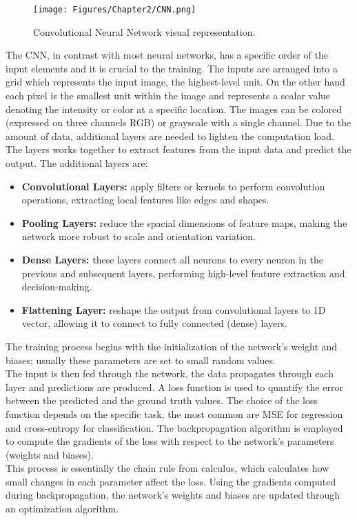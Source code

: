 \begin{figure}[th]
    \centering
    \texttt{[image: Figures/Chapter2/CNN.png]}
    \caption[Convolution Neural Network]{Convolutional Neural Network visual representation.}

    \label{fig:CNN}
\end{figure}
The CNN, in contrast with most neural networks, has a specific order of the input elements and it is crucial to the training. The inputs are arranged into a grid which represents the input image, the highest-level unit. On the other hand each pixel is the smallest unit within the image and represents a scalar value denoting the intensity or color at a specific location. The images can be colored (expressed on three channels RGB) or grayscale with a single channel.
Due to the amount of data, additional layers are needed to lighten the computation load. The layers works together to extract features from the input data and predict the output. The additional layers are:
\begin{itemize}
    \item\textbf{Convolutional Layers:} apply filters or kernels to perform convolution operations, extracting local features like edges and shapes.
    \item\textbf{Pooling Layers:} reduce the spacial dimensions of feature maps, making the network more robust to scale and orientation variation.
    \item\textbf{Dense Layers:} these layers connect all neurons to every neuron in the previous and subsequent layers, performing high-level feature extraction and decision-making.
    \item\textbf{Flattening Layer:} reshape the output from convolutional layers to 1D vector, allowing it to connect to fully connected (dense) layers.
\end{itemize}

The training process begins with the initialization of the network's weight and biases; usually these parameters are set to small random values.\\
The input is then fed through the network, the data propagates through each layer and predictions are produced. A loss function is used to quantify the error between the predicted and the ground truth values. The choice of the loss function depends on the specific task, the most common are MSE for regression and cross-entropy for classification. The backpropagation algorithm is employed to compute the gradients of the loss with respect to the network's parameters (weights and biases).\\
This process is essentially the chain rule from calculus, which calculates how small changes in each parameter affect the loss. Using the gradients computed during backpropagation, the network's weights and biases are updated through an optimization algorithm.

